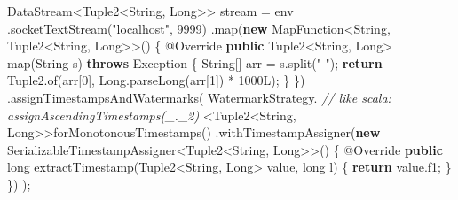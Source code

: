 \documentclass[cn,11pt,chinese]{elegantbook}
\newenvironment{Shaded}{}{}
\newcommand{\AttributeTok}[1]{\textcolor[rgb]{0.49,0.56,0.16}{#1}}
\newcommand{\BuiltInTok}[1]{#1}
\newcommand{\CommentTok}[1]{\textcolor[rgb]{0.38,0.63,0.69}{\textit{#1}}}
\newcommand{\DataTypeTok}[1]{\textcolor[rgb]{0.56,0.13,0.00}{#1}}
\newcommand{\DecValTok}[1]{\textcolor[rgb]{0.25,0.63,0.44}{#1}}
\newcommand{\FunctionTok}[1]{\textcolor[rgb]{0.02,0.16,0.49}{#1}}
\newcommand{\KeywordTok}[1]{\textcolor[rgb]{0.00,0.44,0.13}{\textbf{#1}}}
\newcommand{\NormalTok}[1]{#1}
\newcommand{\StringTok}[1]{\textcolor[rgb]{0.25,0.44,0.63}{#1}}
\begin{document}
\begin{Shaded}
\begin{Highlighting}[]
\NormalTok{        DataStream\textless{}Tuple2\textless{}}\BuiltInTok{String}\NormalTok{, }\BuiltInTok{Long}\NormalTok{\textgreater{}\textgreater{} stream = env}
\NormalTok{            .}\FunctionTok{socketTextStream}\NormalTok{(}\StringTok{"localhost"}\NormalTok{, }\DecValTok{9999}\NormalTok{)}
\NormalTok{            .}\FunctionTok{map}\NormalTok{(}\KeywordTok{new}\NormalTok{ MapFunction\textless{}}\BuiltInTok{String}\NormalTok{, Tuple2\textless{}}\BuiltInTok{String}\NormalTok{, }\BuiltInTok{Long}\NormalTok{\textgreater{}\textgreater{}() \{}
                \AttributeTok{@Override}
                \KeywordTok{public}\NormalTok{ Tuple2\textless{}}\BuiltInTok{String}\NormalTok{, }\BuiltInTok{Long}\NormalTok{\textgreater{} }\FunctionTok{map}\NormalTok{(}\BuiltInTok{String}\NormalTok{ s) }\KeywordTok{throws} \BuiltInTok{Exception}\NormalTok{ \{}
                    \BuiltInTok{String}\NormalTok{[] arr = s.}\FunctionTok{split}\NormalTok{(}\StringTok{" "}\NormalTok{);}
                    \KeywordTok{return}\NormalTok{ Tuple2.}\FunctionTok{of}\NormalTok{(arr[}\DecValTok{0}\NormalTok{], }\BuiltInTok{Long}\NormalTok{.}\FunctionTok{parseLong}\NormalTok{(arr[}\DecValTok{1}\NormalTok{]) * }\DecValTok{1000L}\NormalTok{);}
\NormalTok{                \}}
\NormalTok{            \})}
\NormalTok{            .}\FunctionTok{assignTimestampsAndWatermarks}\NormalTok{(}
\NormalTok{                WatermarkStrategy.}
                    \CommentTok{// like scala: assignAscendingTimestamps(\_.\_2)}
\NormalTok{                    \textless{}Tuple2\textless{}}\BuiltInTok{String}\NormalTok{, }\BuiltInTok{Long}\NormalTok{\textgreater{}\textgreater{}}\FunctionTok{forMonotonousTimestamps}\NormalTok{()}
\NormalTok{                    .}\FunctionTok{withTimestampAssigner}\NormalTok{(}\KeywordTok{new}\NormalTok{ SerializableTimestampAssigner\textless{}Tuple2\textless{}}\BuiltInTok{String}\NormalTok{, }\BuiltInTok{Long}\NormalTok{\textgreater{}\textgreater{}() \{}
                        \AttributeTok{@Override}
                        \KeywordTok{public} \DataTypeTok{long} \FunctionTok{extractTimestamp}\NormalTok{(Tuple2\textless{}}\BuiltInTok{String}\NormalTok{, }\BuiltInTok{Long}\NormalTok{\textgreater{} value, }\DataTypeTok{long}\NormalTok{ l) \{}
                            \KeywordTok{return}\NormalTok{ value.}\FunctionTok{f1}\NormalTok{;}
\NormalTok{                        \}}
\NormalTok{                    \})}
\NormalTok{            );}


\end{Highlighting}
\end{Shaded}
\end{document}
